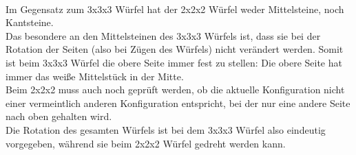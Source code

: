 \documentclass[12pt,a4paper, usenames, dvipsnames]{article}
\begin{document}
\newpage
$\ $\\
Im Gegensatz zum 3x3x3 Würfel hat der 2x2x2 Würfel weder Mittelsteine, noch Kantsteine. \\
Das besondere an den Mittelsteinen des 3x3x3 Würfels ist, dass sie bei der Rotation der Seiten (also bei Zügen des Würfels) nicht verändert werden. Somit ist beim 3x3x3 Würfel die obere Seite immer fest zu stellen: Die obere Seite hat immer das weiße Mittelstück in der Mitte. \\
Beim 2x2x2 muss auch noch geprüft werden, ob die aktuelle Konfiguration nicht einer vermeintlich anderen Konfiguration entspricht, bei der nur eine andere Seite nach oben gehalten wird. \\
Die Rotation des gesamten Würfels ist bei dem 3x3x3 Würfel also eindeutig vorgegeben, während sie beim 2x2x2 Würfel gedreht werden kann. \\
\\


\newpage










\end{document}
